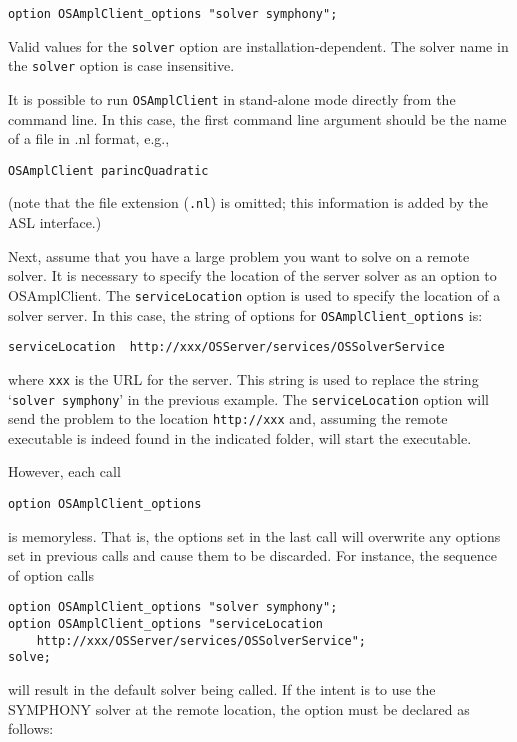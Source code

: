 \begin{verbatim}
option OSAmplClient_options "solver symphony";
\end{verbatim}

Valid values for the {\tt solver} option are installation-dependent.
The solver name in the {\tt solver} option is case insensitive.  

\ifbible
\medskip
It is possible to run {\tt OSAmplClient} in stand-alone mode directly from the command line. In this case, the first command line argument should be the name of a file in .nl format, e.g.,

\begin{verbatim}
OSAmplClient parincQuadratic
\end{verbatim}

\noindent (note that the file extension ({\tt .nl}) is omitted; this information is added by the ASL interface.)
\fi


\label{section:remoteampl}

Next, assume that you have a large problem you want to solve on a remote solver. It is necessary 
to specify the location of the server solver as an option to OSAmplClient. 
The {\tt serviceLocation} option is used to specify the location of a solver server. 
In this case, the string of options for {\tt OSAmplClient\_options} is:

\begin{verbatim}
serviceLocation  http://xxx/OSServer/services/OSSolverService
\end{verbatim}
where {\tt xxx} is the URL for the server.  This string is used to replace the string `{\tt solver symphony}' in the previous example. 
The {\tt serviceLocation} option will send the problem to the %
location {\tt http://xxx} and, assuming the remote executable is indeed found 
in the indicated folder, will start the executable.  


\medskip


However, each call 
\begin{verbatim}
option OSAmplClient_options
\end{verbatim}
is memoryless. That is, the options set in the last call will overwrite any options set in previous calls
and cause them to be discarded.  For instance, the sequence of option calls
\begin{verbatim}
option OSAmplClient_options "solver symphony";
option OSAmplClient_options "serviceLocation  
    http://xxx/OSServer/services/OSSolverService";
solve;
\end{verbatim}
will result in the default solver being called. 
If the intent is to use the SYMPHONY solver at the remote location, the option must be declared
as follows:

